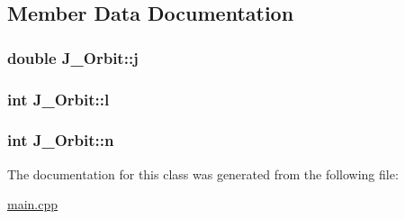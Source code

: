 \subsection{Member Data Documentation}
\hypertarget{class_j___orbit_a4df41865c99b0ffd1560a388eb67ee44}{
\subsubsection[{j}]{\setlength{\rightskip}{0pt plus 5cm}double J\-\_\-\-Orbit\-::j}}\label{class_j___orbit_a4df41865c99b0ffd1560a388eb67ee44}
\hypertarget{class_j___orbit_a975b5fff0c2c2f6366ff4b1cb6f867f3}{
\subsubsection[{l}]{\setlength{\rightskip}{0pt plus 5cm}int J\-\_\-\-Orbit\-::l}}\label{class_j___orbit_a975b5fff0c2c2f6366ff4b1cb6f867f3}
\hypertarget{class_j___orbit_abbbbfd967a5f2d1de6e8a1dbd458ee65}{
\subsubsection[{n}]{\setlength{\rightskip}{0pt plus 5cm}int J\-\_\-\-Orbit\-::n}}\label{class_j___orbit_abbbbfd967a5f2d1de6e8a1dbd458ee65}


The documentation for this class was generated from the following file\-:\begin{DoxyCompactItemize}
\item 
\hyperlink{main_8cpp}{main.\-cpp}\end{DoxyCompactItemize}
